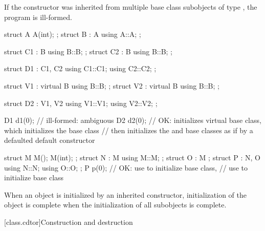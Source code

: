 \pnum
If the constructor was inherited from multiple base class subobjects
of type , the program is ill-formed.
\begin{example}
\begin{codeblock}
struct A { A(int); };
struct B : A { using A::A; };

struct C1 : B { using B::B; };
struct C2 : B { using B::B; };

struct D1 : C1, C2 {
  using C1::C1;
  using C2::C2;
};

struct V1 : virtual B { using B::B; };
struct V2 : virtual B { using B::B; };

struct D2 : V1, V2 {
  using V1::V1;
  using V2::V2;
};

D1 d1(0);           // ill-formed: ambiguous
D2 d2(0);           // OK: initializes virtual  base class, which initializes the  base class
                    // then initializes the  and  base classes as if by a defaulted default constructor

struct M { M(); M(int); };
struct N : M { using M::M; };
struct O : M {};
struct P : N, O { using N::N; using O::O; };
P p(0);             // OK: use  to initialize  base class,
                    // use  to initialize  base class
\end{codeblock}
\end{example}

\pnum
When an object is initialized by an inherited constructor,
initialization of the object is complete
when the initialization of all subobjects is complete.%

[class.cdtor]{Construction and destruction}%
%
%

